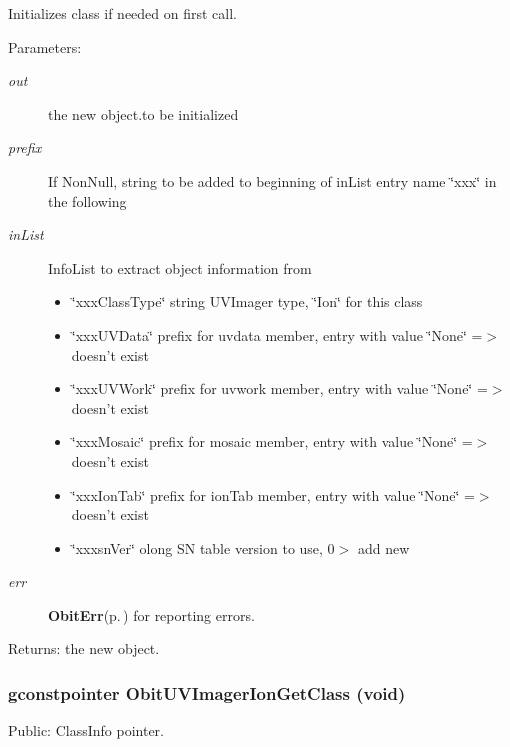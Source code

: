 Initializes class if needed on first call. \begin{Desc}
\item[Parameters:]
\begin{description}
\item[{\em out}]the new object.to be initialized \item[{\em prefix}]If Non\-Null, string to be added to beginning of in\-List entry name \char`\"{}xxx\char`\"{} in the following \item[{\em in\-List}]Info\-List to extract object information from \begin{itemize}
\item \char`\"{}xxx\-Class\-Type\char`\"{} string UVImager type, \char`\"{}Ion\char`\"{} for this class \item \char`\"{}xxx\-UVData\char`\"{} prefix for uvdata member, entry with value \char`\"{}None\char`\"{} =$>$ doesn't exist \item \char`\"{}xxx\-UVWork\char`\"{} prefix for uvwork member, entry with value \char`\"{}None\char`\"{} =$>$ doesn't exist \item \char`\"{}xxx\-Mosaic\char`\"{} prefix for mosaic member, entry with value \char`\"{}None\char`\"{} =$>$ doesn't exist \item \char`\"{}xxx\-Ion\-Tab\char`\"{} prefix for ion\-Tab member, entry with value \char`\"{}None\char`\"{} =$>$ doesn't exist \item \char`\"{}xxxsn\-Ver\char`\"{} olong SN table version to use, 0$>$ add new \end{itemize}
\item[{\em err}]{\bf Obit\-Err}{\rm (p.\,\pageref{structObitErr})} for reporting errors. \end{description}
\end{Desc}
\begin{Desc}
\item[Returns:]the new object. \end{Desc}
\subsubsection{\setlength{\rightskip}{0pt plus 5cm}gconstpointer Obit\-UVImager\-Ion\-Get\-Class (void)}\label{ObitUVImagerIon_8c_a8}


Public: Class\-Info pointer. 

